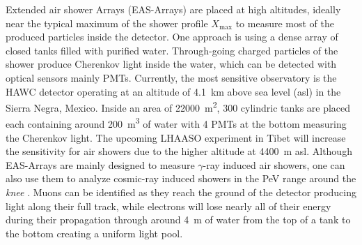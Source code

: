 Extended air shower Arrays (EAS-Arrays) are placed at high altitudes, ideally near the typical maximum of the shower profile $X_{\mathrm{max}}$ to measure most of the produced particles inside the detector.
One approach is using a dense array of closed tanks filled with purified water.
Through-going charged particles of the shower produce Cherenkov light inside the water, which can be detected with optical sensors mainly PMTs.
Currently, the most sensitive observatory is the HAWC detector \cite{HAWC17} operating at an altitude of \SI{4.1}{km} above sea level (asl) in the Sierra Negra, Mexico.
Inside an area of \SI{22000}{\square\meter}, 300 cylindric tanks are placed each containing around \SI{200}{\cubic\meter} of water with 4 PMTs at the bottom measuring the Cherenkov light.
The upcoming LHAASO experiment in Tibet \cite{LHAASO19} will increase the sensitivity for air showers due to the higher altitude at \SI{4400}{m} asl.
Although EAS-Arrays are mainly designed to measure $\gamma$-ray induced air showers, one can also use them to analyze cosmic-ray induced showers in the PeV range around the \textit{knee} \cite{HAWC17CRSpectrum}.
Muons can be identified as they reach the ground of the detector producing light along their full track, while electrons will lose nearly all of their energy during their propagation through around \SI{4}{m} of water from the top of a tank to the bottom creating a uniform light pool.

